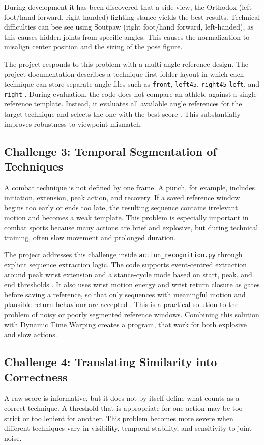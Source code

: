 \documentclass[12pt]{article}
\begin{document}
During development it has been discovered that a side view, the Orthodox (left foot/hand forward, right-handed) fighting stance yields the best results. Technical difficulties can bee see using Soutpaw (right foot/hand forward, left-handed), as this causes hidden joints from specific angles. This causes the normalization to misalign center position and the sizing of the pose figure.

The project responds to this problem with a multi-angle reference design. The project documentation describes a technique-first folder layout in which each technique can store separate angle files such as \texttt{front}, \texttt{left45}, \texttt{right45} \texttt{left}, and \texttt{right} \cite{projectReadme}. During evaluation, the code does not compare an athlete against a single reference template. Instead, it evaluates all available angle references for the target technique and selects the one with the best score \cite{projectActionRecognition}. This substantially improves robustness to viewpoint mismatch.

\subsection{Challenge 3: Temporal Segmentation of Techniques}
A combat technique is not defined by one frame. A punch, for example, includes initiation, extension, peak action, and recovery. If a saved reference window begins too early or ends too late, the resulting sequence contains irrelevant motion and becomes a weak template. This problem is especially important in combat sports because many actions are brief and explosive, but during technical training, often slow movement and prolonged duration.

The project addresses this challenge inside \texttt{action\_recognition.py} through explicit sequence extraction logic. The code supports event-centred extraction around peak wrist extension and a stance-cycle mode based on start, peak, and end thresholds \cite{projectActionRecognition}. It also uses wrist motion energy and wrist return closure as gates before saving a reference, so that only sequences with meaningful motion and plausible return behaviour are accepted \cite{projectActionRecognition}. This is a practical solution to the problem of noisy or poorly segmented reference windows.
Combining this solution with Dynamic Time Warping creates a program, that work for both explosive and slow actions.

\subsection{Challenge 4: Translating Similarity into Correctness}
A raw score is informative, but it does not by itself define what counts as a correct technique. A threshold that is appropriate for one action may be too strict or too lenient for another. This problem becomes more severe when different techniques vary in visibility, temporal stability, and sensitivity to joint noise.
\end{document}
